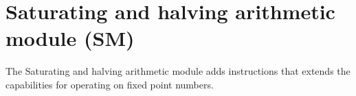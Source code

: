 %

\chapter{Saturating and halving arithmetic module (SM)}
\label{module:SM}

The Saturating and halving arithmetic module adds instructions that extends the
capabilities for operating on fixed point numbers.

\tbd
